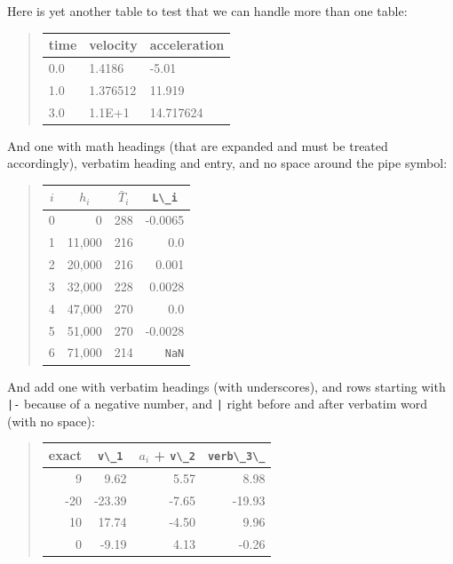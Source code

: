 \n\documentclass[%
oneside,                 %
final,                   %
10pt]{article}
\theoremstyle{definition}
\begin{document}
\begin{enumerate}
Here is yet another table to test that we can handle more than
one table:


\begin{quote}
\begin{tabular}{lll}
\hline
\multicolumn{1}{l}{ time } & \multicolumn{1}{l}{ velocity } & \multicolumn{1}{l}{ acceleration } \\
\hline
0.0  & 1.4186   & -5.01        \\
1.0  & 1.376512 & 11.919       \\
3.0  & 1.1E+1   & 14.717624    \\
\hline
\end{tabular}
\end{quote}

\noindent
And one with math headings (that are expanded and must be treated
accordingly), verbatim heading and entry, and no space around the pipe
symbol:


\begin{quote}
\begin{tabular}{lrrr}
\hline
\multicolumn{1}{c}{ $i$ } & \multicolumn{1}{c}{ $h_i$ } & \multicolumn{1}{c}{ $\bar T_i$ } & \multicolumn{1}{c}{ \Verb!L\_i! } \\
\hline
0   & 0      & 288        & -0.0065    \\
1   & 11,000 & 216        & 0.0        \\
2   & 20,000 & 216        & 0.001      \\
3   & 32,000 & 228        & 0.0028     \\
4   & 47,000 & 270        & 0.0        \\
5   & 51,000 & 270        & -0.0028    \\
6   & 71,000 & 214        & \texttt{NaN} \\
\hline
\end{tabular}
\end{quote}

\noindent
And add one with verbatim headings (with underscores),
and rows starting with \texttt{|-} because of a negative number,
and \texttt{|} right before and after verbatim word (with no space):


\begin{quote}
\begin{tabular}{rrrr}
\hline
\multicolumn{1}{c}{ exact } & \multicolumn{1}{c}{ \Verb!v\_1! } & \multicolumn{1}{c}{ $a_i$ + \Verb!v\_2! } & \multicolumn{1}{c}{ \Verb!verb\_3\_! } \\
\hline
9     & 9.62       & 5.57               & 8.98           \\
-20   & -23.39     & -7.65              & -19.93         \\
10    & 17.74      & -4.50              & 9.96           \\
0     & -9.19      & 4.13               & -0.26          \\
\hline
\end{tabular}
\end{quote}


\end{enumerate}
\end{document}
